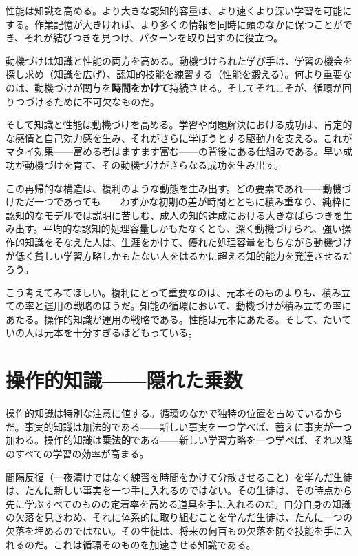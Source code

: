 \documentclass[11pt, twoside, openright]{book}
\begin{document}
性能は知識を高める。より大きな認知的容量は、より速くより深い学習を可能にする。作業記憶が大きければ、より多くの情報を同時に頭のなかに保つことができ、それが結びつきを見つけ、パターンを取り出すのに役立つ。

動機づけは知識と性能の両方を高める。動機づけられた学び手は、学習の機会を探し求め（知識を広げ）、認知的技能を練習する（性能を鍛える）。何より重要なのは、動機づけが関与を\textbf{時間をかけて}持続させる。そしてそれこそが、循環が回りつづけるために不可欠なものだ。

そして知識と性能は動機づけを高める。学習や問題解決における成功は、肯定的な感情と自己効力感を生み、それがさらに学ぼうとする駆動力を支える。これがマタイ効果------富める者はますます富む------の背後にある仕組みである。早い成功が動機づけを育て、その動機づけがさらなる成功を生み出す。

この再帰的な構造は、複利のような動態を生み出す。どの要素であれ------動機づけただ一つであっても------わずかな初期の差が時間とともに積み重なり、純粋に認知的なモデルでは説明に苦しむ、成人の知的達成における大きなばらつきを生み出す。平均的な認知的処理容量しかもたなくとも、深く動機づけられ、強い操作的知識をそなえた人は、生涯をかけて、優れた処理容量をもちながら動機づけが低く貧しい学習方略しかもたない人をはるかに超える知的能力を発達させるだろう。

こう考えてみてほしい。複利にとって重要なのは、元本そのものよりも、積み立ての率と運用の戦略のほうだ。知能の循環において、動機づけが積み立ての率にあたる。操作的知識が運用の戦略である。性能は元本にあたる。そして、たいていの人は元本を十分すぎるほどもっている。

\section*{操作的知識------隠れた乗数}

操作的知識は特別な注意に値する。循環のなかで独特の位置を占めているからだ。事実的知識は加法的である------新しい事実を一つ学べば、蓄えに事実が一つ加わる。操作的知識は\textbf{乗法的}である------新しい学習方略を一つ学べば、それ以降のすべての学習の効率が高まる。

間隔反復（一夜漬けではなく練習を時間をかけて分散させること）を学んだ生徒は、たんに新しい事実を一つ手に入れるのではない。その生徒は、その時点から先に学ぶすべてのものの定着率を高める道具を手に入れるのだ。自分自身の知識の欠落を見きわめ、それに体系的に取り組むことを学んだ生徒は、たんに一つの欠落を埋めるのではない。その生徒は、将来の何百もの欠落を防ぐ技能を手に入れるのだ。これは循環そのものを加速させる知識である。
\end{document}
